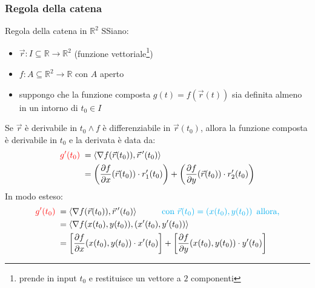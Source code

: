 \documentclass{article}  %
\begin{document}
\subsubsection{Regola della catena}

\begin{theorem}{Regola della catena in $\mathbb{R}^2$}
	SSiano:
	\begin{itemize}
		\item $\vec{r}: I \subseteq \mathbb{R} \to \mathbb{R}^2$ (funzione vettoriale\footnote{prende in input $t_0$ e restituisce un vettore a $2$ componenti})
		\item $f: A \subseteq \mathbb{R}^2 \to \mathbb{R}$ con $A$ aperto
		\item suppongo che la funzione composta $g(t)=f(\vec{r}(t))$ sia definita almeno in un intorno di $t_0 \in I$
	\end{itemize}
	Se $\vec{r}$ è derivabile in $t_0 \land f$ è differenziabile in $\vec{r}(t_0)$, allora la funzione composta è derivabile in $t_0$ e la derivata è data da:
	\begin{align*}
		\textcolor{red}{g'(t_0) \;} & = \langle \nabla f(\vec{r}(t_0)), \vec{r} \, '(t_0) \rangle                                                                                           \\
		                            & = \left(\frac{\partial f}{\partial x}(\vec{r}(t_0)) \cdot r_1'(t_0)\right) + \left(\frac{\partial f}{\partial y}(\vec{r}(t_0)) \cdot r_2'(t_0)\right)
	\end{align*}
	In modo esteso:
	\begin{align*}
		\textcolor{red}{g'(t_0) \;} & = \langle \nabla f(\vec{r}(t_0)), \vec{r} \, '(t_0) \rangle \quad \quad \quad \textcolor{cyan}{\text{con }\vec{r}(t_0)=\left(x(t_0),y(t_0) \right) \text{ allora,}} \\
		                            & = \langle \nabla f(x(t_0),y(t_0)), (x'(t_0),y'(t_0))\rangle                                                                                                         \\
		                            & = \left[\frac{\partial f}{\partial x}(x(t_0),y(t_0)) \cdot x'(t_0)\right] + \left[\frac{\partial f}{\partial y}(x(t_0),y(t_0)) \cdot y'(t_0)\right]
	\end{align*}
\end{theorem}
\end{document}
